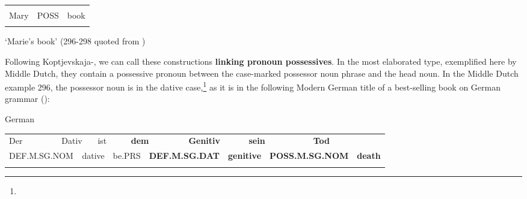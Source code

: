 \begin{tabular}{lll}
\lsptoprule
\multicolumn{3}{l}{Marie

}\\
Mary & POSS & book\\
\lspbottomrule
\end{tabular}

\begin{styleTranslation}
‘Marie’s book’ (296{}-298 quoted from \citet[56]{Norde1997})

\end{styleTranslation}

\begin{styleBodyTextFirst}
Following Koptjevskaja-\citet{Tamm2003}, we can call these constructions \textbf{linking pronoun possessives}. In the most elaborated type, exemplified here by Middle Dutch, they contain a possessive pronoun between the case-marked possessor noun phrase and the head noun. In the Middle Dutch example 296, the possessor noun is in the dative case,\footnote{} as it is in the following Modern German title of a best-selling book on German grammar (\citet{Sick2004}):

\end{styleBodyTextFirst}

\begin{listWWNumileveli}
\item {}

\begin{styleExample}
\label{bkm:Ref126571195}German

\end{styleExample}

\end{listWWNumileveli}

\begin{tabular}{llllllllllllll}
\lsptoprule
Der & \multicolumn{2}{l}{Dativ

} & \multicolumn{2}{l}{ist

} & \multicolumn{2}{l}{{\bfseries dem}

} & \multicolumn{2}{l}{{\bfseries Genitiv}

} & \multicolumn{2}{l}{{\bfseries sein}

} & \multicolumn{2}{l}{{\bfseries Tod}

} & \\
\multicolumn{2}{l}{DEF.M.SG.NOM

} & \multicolumn{2}{l}{dative

} & \multicolumn{2}{l}{be.PRS

} & \multicolumn{2}{l}{{\bfseries DEF.M.SG.DAT}

} & \multicolumn{2}{l}{{\bfseries genitive}

} & \multicolumn{2}{l}{{\bfseries POSS.M.SG.NOM}

} & \multicolumn{2}{l}{{\bfseries death}

}\\
\lspbottomrule
\end{tabular}

